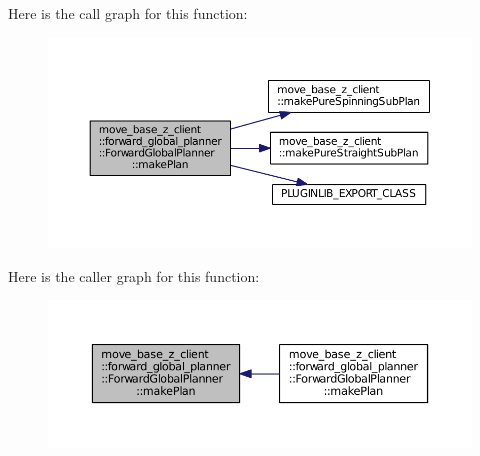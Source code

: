 Here is the call graph for this function\+:
\nopagebreak
\begin{figure}[H]
\begin{center}
\leavevmode
\includegraphics[width=350pt]{classmove__base__z__client_1_1forward__global__planner_1_1ForwardGlobalPlanner_a2dcf9aad74efaaa92ee78650f7a23096_cgraph}
\end{center}
\end{figure}




Here is the caller graph for this function\+:
\nopagebreak
\begin{figure}[H]
\begin{center}
\leavevmode
\includegraphics[width=350pt]{classmove__base__z__client_1_1forward__global__planner_1_1ForwardGlobalPlanner_a2dcf9aad74efaaa92ee78650f7a23096_icgraph}
\end{center}
\end{figure}


